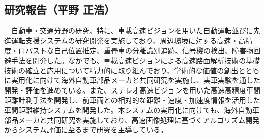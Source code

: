 \subsection{研究報告（平野 正浩）}

　自動車・交通分野の研究、特に、車載高速ビジョンを用いた自動運転並びに先進運転支援システムの研究開発を実施しており、周辺環境に対する高速・高精度・ロバストな自己位置推定、重畳車の分離識別追跡、信号機の検出、障害物回避手法を開発した。なかでも、車載高速ビジョンによる高速路面解析技術の基礎技術の確立と応用について精力的に取り組んでおり、学術的な価値の創出とともに実用化に向けて海外自動車部品メーカと共同研究を実施し、実車実験を通した開発・評価を進めている。また、ステレオ高速ビジョンを用いた高速高精度車間距離計測手法を開発し、前車両との相対的な距離・速度・加速度情報を活用した車間距離維持システムを開発した。本システムの実用化に向けても、海外自動車部品メーカと共同研究を実施しており、高速画像処理に基づくアルゴリズム開発からシステム評価に至るまで研究を主導している。


